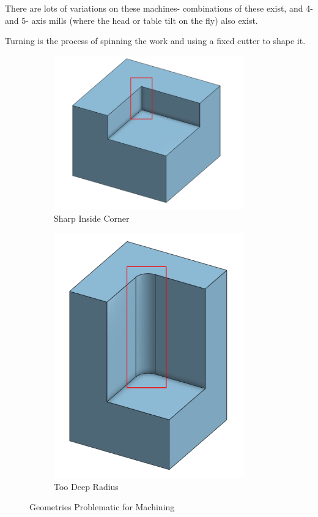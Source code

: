 \documentclass[10pt,letterpaper]{book}
\begin{document}
 
 There are lots of variations on these machines- combinations of these exist, and 4- and 5- axis mills (where the head or table tilt on the fly) also exist.
  
 Turning is the process of spinning the work and using a fixed cutter to shape it.
 
\begin{figure}[H]
	\centering
	\begin{subfigure}[b]{.24\linewidth}
		\includegraphics[width=0.9\textwidth]{imgs/nonmill_sharpins.png}
		\caption{Sharp Inside Corner}
	\end{subfigure}	\begin{subfigure}[b]{.24\linewidth}
		\includegraphics[width=0.9\textwidth]{imgs/nonmill_dtod.png}
		\caption{Too Deep Radius}
	\end{subfigure}	
	
	\caption{Geometries Problematic for Machining}
\end{figure}
\end{document}
